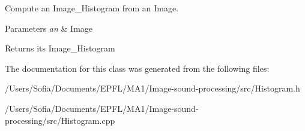 Compute an Image\+\_\+\+Histogram from an Image. 


\begin{DoxyParams}{Parameters}
{\em an} & Image \\
\hline
\end{DoxyParams}
\begin{DoxyReturn}{Returns}
its Image\+\_\+\+Histogram 
\end{DoxyReturn}


The documentation for this class was generated from the following files\+:\begin{DoxyCompactItemize}
\item 
/\+Users/\+Sofia/\+Documents/\+E\+P\+F\+L/\+M\+A1/\+Image-\/sound-\/processing/src/Histogram.\+h\item 
/\+Users/\+Sofia/\+Documents/\+E\+P\+F\+L/\+M\+A1/\+Image-\/sound-\/processing/src/Histogram.\+cpp\end{DoxyCompactItemize}

